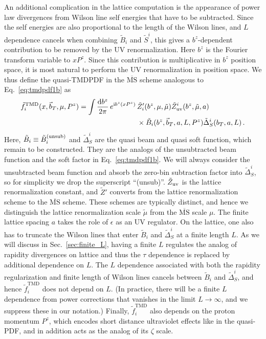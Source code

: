\documentclass[11pt,a4paper]{article}
\DeclareRobustCommand{\eq}[1]{Eq.~\eqref{eq:#1}}
\DeclareRobustCommand{\sec}[1]{Sec.~\ref{sec:#1}}
\newcommand{\MS}{\overline{\mathrm{MS}}}
\newcommand{\df}{\mathrm{d}}
\newcommand{\img}{\mathrm{i}}
\newcommand{\eps}{\epsilon}
\newcommand{\nn}{\nonumber}
\newcommand\TMD{\mathrm{TMD}}
\newcommand{\bt}{\vec b_T}
\newcommand{\unsub}{{\rm(unsub)}}
\begin{document}
An additional complication in the lattice computation is the appearance of power law divergences from Wilson line self energies that have to be subtracted.
Since the self energies are also proportional to the length of the Wilson lines, and $L$ dependence cancels when combining $\tilde B_i$ and $\tilde S^i$, this gives a $b^z$-dependent contribution to be removed by the UV renormalization. Here $b^z$ is the Fourier transform variable to $xP^z$.
Since this contribution is multiplicative in $b^z$ position space, it is most natural to perform the UV renormalization in position space.
We thus define the quasi-TMDPDF in the $\MS$ scheme analogous to \eq{tmdpdf1b} as
\begin{align} \label{eq:qtmdpdf}
 \tilde f_i^\TMD(x, \bt,\mu,P^z) = \int \frac{\df b^z}{2\pi} \, e^{\img b^z (x P^z)}\,
 &\tilde Z'_i(b^z,\mu,\tilde \mu) \tilde Z_{\rm uv}^i(b^z,\tilde \mu, a)
 \nn\\&\times
 \tilde B_i(b^z, \bt, a, L, P^z) \tilde\Delta_S^i(b_T, a, L)
\,.\end{align}
Here, $\tilde B_i \equiv \tilde B_i^\unsub $ and $\tilde \Delta_S^i$ are the quasi beam and quasi soft function, which remain to be constructed.
They are the analogs of the unsubtracted beam function and the soft factor in \eq{tmdpdf1b}.
We will always consider the unsubtracted beam function and absorb the zero-bin subtraction factor into $\tilde \Delta_S^i$, so for simplicity we drop the superscript ``(unsub)''.
$\tilde Z_{\rm uv}$ is the lattice renormalization constant, and $\tilde Z'$ converts from the lattice renormalization scheme to the $\MS$ scheme. These schemes are typically distinct, and hence we distinguish the lattice renormalization scale $\tilde \mu$ from the $\MS$ scale $\mu$.
The finite lattice spacing $a$ takes the role of $\eps$ as an UV regulator.
On the lattice, one also has to truncate the Wilson lines that enter $\tilde B_i$ and $\tilde \Delta_S^i$ at a finite length $L$.
As we will discuss in \sec{finite_L}, having a finite $L$ regulates the analog of rapidity divergences on lattice and thus the $\tau$ dependence is replaced by additional dependence on $L$.
The $L$ dependence associated with both the rapidity regularization and finite length of Wilson lines cancels between $\tilde B_i$ and $\tilde \Delta_S^i$, and hence $\tilde f_i^\TMD$ does not depend on $L$.
(In practice, there will be a finite $L$ dependence from power corrections that vanishes in the limit $L\to\infty$, and we suppress these in our notation.)
Finally, $\tilde f_i^\TMD$ also depends on the proton momentum $P^z$, which encodes short distance ultraviolet effects like in the quasi-PDF, and in addition acts as the analog of its $\zeta$ scale.
\end{document}

